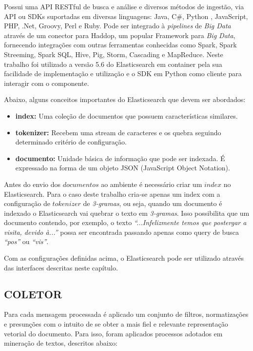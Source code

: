 \documentclass[12pt,a4paper]{article}
\begin{document}
Possui uma API RESTful de busca e análise e diversos métodos de ingestão, via API ou SDKs suportadas em diversas linguagens:
 Java, C\#, Python , JavaScript, PHP, .Net, Groovy, Perl e Ruby. Pode ser integrado à \textit{pipelines} de \textit{Big Data} através
 de um conector para Haddop, um popular Framework para \textit{Big Data}, fornecendo integrações com outras ferramentas conhecidas como Spark, Spark Streeming, Spark SQL,
 Hive, Pig, Storm, Cascading e MapReduce. Neste trabalho foi utilizado a versão 5.6 do Elasticsearch em container pela sua facilidade de implementação e utilização e o SDK em Python como cliente para interagir com o componente. 

Abaixo, alguns conceitos importantes do Elasticsearch que devem ser abordados:

 \begin{itemize}
   \item \textbf{index:} Uma coleção de documentos que possuem características similares.
   \item \textbf{tokenizer:} Recebem uma stream de caracteres e os quebra seguindo determinado critério de configuração.
   \item \textbf{documento:} Unidade básica de informação que pode ser indexada. É expressado na forma de um objeto JSON (JavaScript Object Notation).
 \end{itemize}

Antes do envio dos $documentos$ ao ambiente é necessário criar um $index$ no Elasticsearch. Para o caso deste trabalho cria-se apenas um index com a configuração
de $tokenizer$ de \textit{3-gramas}, ou seja, quando um documento é indexado o Elasticsearch vai quebrar o texto em \textit{3-gramas}. Isso
possibilita que um documento contendo, por exemplo, o texto \textit{``...Infelizmente temos que postergar a visita, devido à...''} possa ser encontrada passando
apenas como query de busca \textit{``pos''} ou \textit{``vis''}.

Com as configurações definidas acima, o Elasticsearch pode ser utilizado através das interfaces descritas neste capítulo.


\subsection{COLETOR} \label{sec:coletor}
Para cada mensagem processada é aplicado um conjunto de filtros, normatizações e presunções com o intuito de se obter a mais fiel e relevante representação vetorial do documento.
 Para isso, foram aplicados processos adotados em mineração de textos, descritos abaixo:
\end{document}
